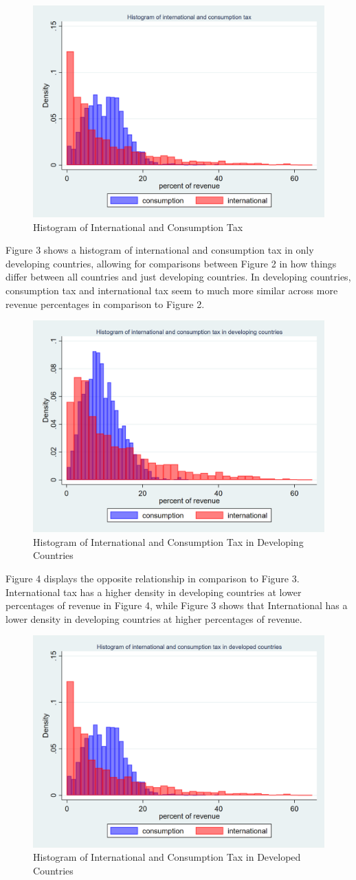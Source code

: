 \documentclass[12pt]{article}
\begin{document}
\begin{figure}[h]
    \centering
    \includegraphics[width=0.5\linewidth]{Reproducibility_Package//png_files/twowayhistintcons.png}
    \caption{Histogram of International and Consumption Tax}
    \label{fig:enter-label}
\end{figure}

Figure 3 shows a histogram of international and consumption tax in only developing countries, allowing for comparisons between Figure 2 in how things differ between all countries and just developing countries. In developing countries, consumption tax and international tax seem to much more similar across more revenue percentages in comparison to Figure 2. 

\begin{figure}[h]
    \centering
    \includegraphics[width=0.5\linewidth]{Reproducibility_Package//png_files/twowayhistdevelopingintcons.png}
    \caption{Histogram of International and Consumption Tax in Developing Countries}
    \label{fig:enter-label}
\end{figure}

Figure 4 displays the opposite relationship in comparison to Figure 3. International tax has a higher density in developing countries at lower percentages of revenue in Figure 4, while Figure 3 shows that International has a lower density in developing countries at higher percentages of revenue. 

\begin{figure}[h]
    \centering
    \includegraphics[width=0.5\linewidth]{Reproducibility_Package//png_files/twowayhistdevelopedintcons.png}
    \caption{Histogram of International and Consumption Tax in Developed Countries}
    \label{fig:enter-label}
\end{figure}
\end{document}
